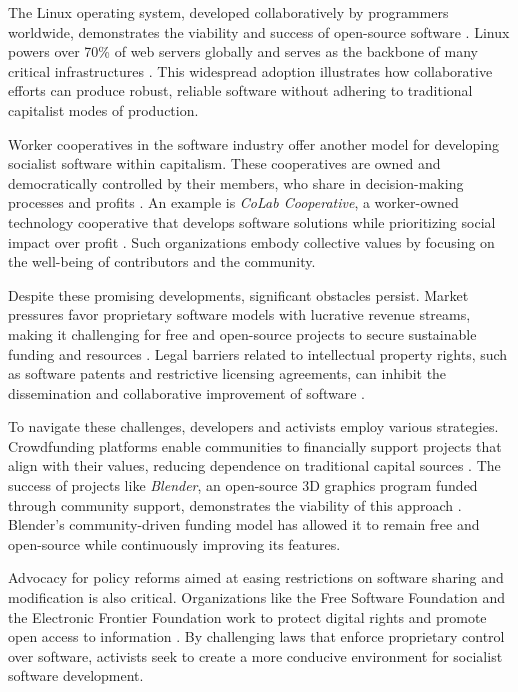 \begin{refsection}
The Linux operating system, developed collaboratively by programmers worldwide, demonstrates the viability and success of open-source software \cite[pp.~85-88]{Raymond1999}. Linux powers over 70\% of web servers globally and serves as the backbone of many critical infrastructures \cite[pp.~136-138]{LinuxFoundation2020}. This widespread adoption illustrates how collaborative efforts can produce robust, reliable software without adhering to traditional capitalist modes of production.

Worker cooperatives in the software industry offer another model for developing socialist software within capitalism. These cooperatives are owned and democratically controlled by their members, who share in decision-making processes and profits \cite[pp.~45-47]{Wright2010}. An example is \textit{CoLab Cooperative}, a worker-owned technology cooperative that develops software solutions while prioritizing social impact over profit \cite[pp.~120-122]{CoLab2020}. Such organizations embody collective values by focusing on the well-being of contributors and the community.

Despite these promising developments, significant obstacles persist. Market pressures favor proprietary software models with lucrative revenue streams, making it challenging for free and open-source projects to secure sustainable funding and resources \cite[pp.~66-68]{McLeod2005}. Legal barriers related to intellectual property rights, such as software patents and restrictive licensing agreements, can inhibit the dissemination and collaborative improvement of software \cite[pp.~85-88]{Lessig2006}.

To navigate these challenges, developers and activists employ various strategies. Crowdfunding platforms enable communities to financially support projects that align with their values, reducing dependence on traditional capital sources \cite[pp.~150-152]{Scholz2016}. The success of projects like \textit{Blender}, an open-source 3D graphics program funded through community support, demonstrates the viability of this approach \cite{Blender2020}. Blender's community-driven funding model has allowed it to remain free and open-source while continuously improving its features.

Advocacy for policy reforms aimed at easing restrictions on software sharing and modification is also critical. Organizations like the Free Software Foundation and the Electronic Frontier Foundation work to protect digital rights and promote open access to information \cite[pp.~175-178]{EFF2020}. By challenging laws that enforce proprietary control over software, activists seek to create a more conducive environment for socialist software development.


\end{refsection}
